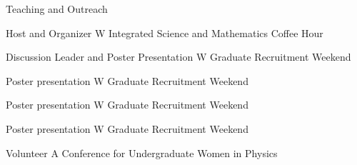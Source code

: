 \begin{rubric}{Teaching and Outreach}

        {Host and Organizer}
        {W Integrated Science and Mathematics Coffee Hour}

        {Discussion Leader and Poster Presentation}
        {W Graduate Recruitment Weekend}

        {Poster presentation}
        {W Graduate Recruitment Weekend}

        {Poster presentation}
        {W Graduate Recruitment Weekend}

        {Poster presentation}
        {W Graduate Recruitment Weekend}

        {Volunteer}
        {A Conference for Undergraduate Women in Physics}
\end{rubric}

\endgroup

